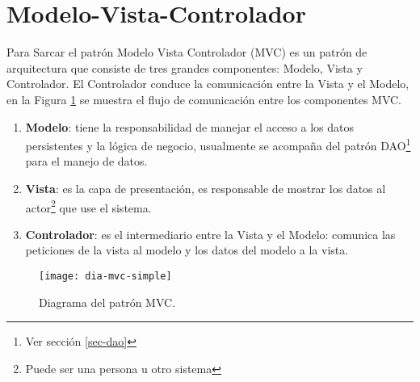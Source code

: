 \section{Modelo-Vista-Controlador}\label{sec-mvc}
Para Sarcar\cite{JavaDesignPatternsExamples} el patrón Modelo Vista Controlador (MVC) es un patrón de arquitectura que consiste de tres grandes componentes: Modelo, Vista y Controlador. El Controlador conduce la comunicación entre la Vista y el Modelo, en la Figura \ref{fig:dia-mvc-simple} se muestra el flujo de comunicación entre los componentes MVC.
\begin{enumerate}
	\item \textbf{Modelo}: tiene la responsabilidad de manejar el acceso a los datos persistentes y la lógica de negocio, usualmente se acompaña del patrón DAO\footnote{Ver sección \ref{sec-dao}} para el manejo de datos.
	\item \textbf{Vista}: es la capa de presentación, es responsable de mostrar los datos al actor\footnote{Puede ser una persona u otro sistema} que use el sistema.
	\item \textbf{Controlador}: es el intermediario entre la Vista y el Modelo: comunica las peticiones de la vista al modelo y los datos del modelo a la vista.
\end{enumerate}
\begin{figure}[h]
  \centering
  \texttt{[image: dia-mvc-simple]}
  \caption{Diagrama del patrón MVC.}
  \label{fig:dia-mvc-simple}
\end{figure}

